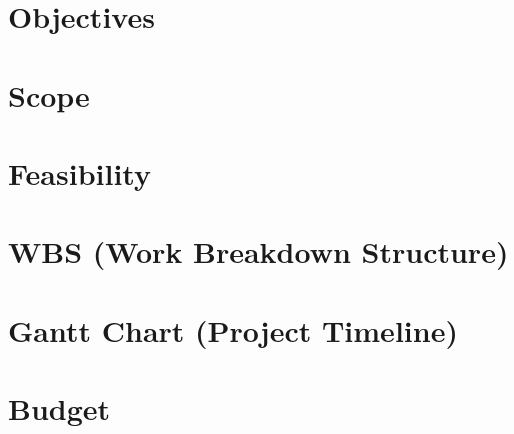 \documentclass[12pt,a4paper]{report}
\begin{document}



\tableofcontents
\thispagestyle{empty}
\addtocounter{page}{-1}
\newpage


\chapter{Objectives}
\label{objectives}


\chapter{Scope}
\label{scope}


\chapter{Feasibility}
\label{feasibility}


\chapter{WBS (Work Breakdown Structure)}
\label{wbs}


\chapter{Gantt Chart (Project Timeline)}
\label{ganttchart}


\chapter{Budget}
\label{budget}



\end{document}
